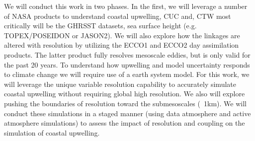 We will conduct this work in two phases.  In the first, we will leverage a number of NASA products to understand coastal upwelling, CUC and, CTW most critically will be the GHRSST datasets, sea surface height (e.g. TOPEX/POSEIDON or JASON2).  We will also explore how the linkages are altered with resolution by utilizing the ECCO1 and ECCO2 day assimilation products.  The latter product fully resolves mesoscale eddies, but is only valid for the past 20 years.  To understand how upwelling and model uncertainty responds to climate change we will require use of a earth system model.  For this work, we will leverage the unique variable resolution capability to accurately simulate coastal upwelling without requiring global high resolution.  We also will explore pushing the boundaries of resolution toward the submesoscales (~1km).  We will conduct these simulations in a staged manner (using data atmosphere and active atmosphere simulations) to assess the impact of resolution and coupling on the simulation of coastal upwelling.
